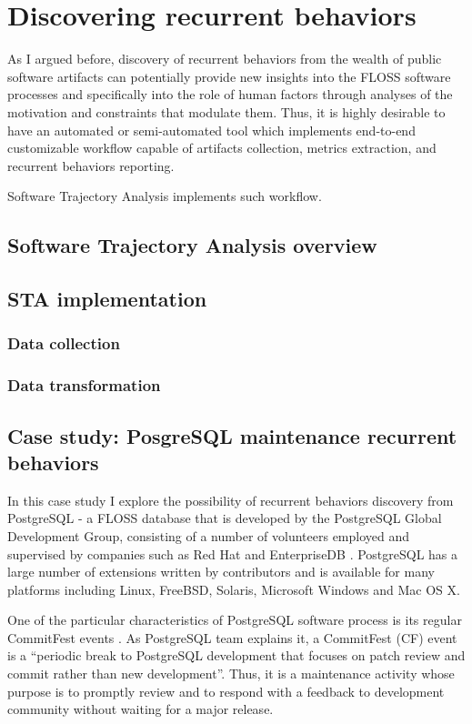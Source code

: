\chapter{Discovering recurrent behaviors}\label{chapter_sta}
As I argued before, discovery of recurrent behaviors from the wealth of public software artifacts can potentially 
provide new insights into the FLOSS software processes and specifically into the role of human factors through 
analyses of the motivation and constraints that modulate them. 
Thus, it is highly desirable to have an automated or semi-automated tool which implements end-to-end 
customizable workflow capable of artifacts collection, metrics extraction, and recurrent behaviors reporting.

Software Trajectory Analysis implements such workflow. 

\section{Software Trajectory Analysis overview}
\section{STA implementation}
\subsection{Data collection}
\subsection{Data transformation}
\section{Case study: PosgreSQL maintenance recurrent behaviors}
In this case study I explore the possibility of recurrent behaviors discovery from PostgreSQL - a FLOSS database that 
is developed by the PostgreSQL Global Development Group, consisting of a number of volunteers employed and 
supervised by companies such as Red Hat and EnterpriseDB \cite{postgre-contrib}.
PostgreSQL has a large number of extensions written by contributors and is available for many platforms including 
Linux, FreeBSD, Solaris, Microsoft Windows and Mac OS X.

One of the particular characteristics of PostgreSQL software process is its regular CommitFest events \cite{postgre-commitfest}.
As PostgreSQL team explains it, a CommitFest (CF) event is a ``periodic break to PostgreSQL development that focuses on patch 
review and commit rather than new development''.  Thus, it is a maintenance activity whose purpose is to promptly review 
and to respond with a feedback to development community without waiting for a major release. 

